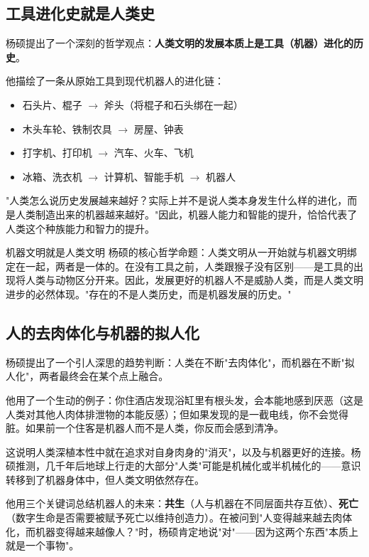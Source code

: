\documentclass[a4paper]{article}
\begin{document}
\subsection{工具进化史就是人类史}

杨硕提出了一个深刻的哲学观点：\textbf{人类文明的发展本质上是工具（机器）进化的历史}。

他描绘了一条从原始工具到现代机器人的进化链：
\begin{itemize}
    \item 石头片、棍子 $\to$ 斧头（将棍子和石头绑在一起）
    \item 木头车轮、铁制农具 $\to$ 房屋、钟表
    \item 打字机、打印机 $\to$ 汽车、火车、飞机
    \item 冰箱、洗衣机 $\to$ 计算机、智能手机 $\to$ 机器人
\end{itemize}

"人类怎么说历史发展越来越好？实际上并不是说人类本身发生什么样的进化，而是人类制造出来的机器越来越好。"因此，机器人能力和智能的提升，恰恰代表了人类这个种族能力和智力的提升。

\begin{importantbox}{机器文明就是人类文明}
杨硕的核心哲学命题：人类文明从一开始就与机器文明绑定在一起，两者是一体的。在没有工具之前，人类跟猴子没有区别——是工具的出现将人类与动物区分开来。因此，发展更好的机器人不是威胁人类，而是人类文明进步的必然体现。"存在的不是人类历史，而是机器发展的历史。"
\end{importantbox}

\subsection{人的去肉体化与机器的拟人化}

杨硕提出了一个引人深思的趋势判断：人类在不断"去肉体化"，而机器在不断"拟人化"，两者最终会在某个点上融合。

他用了一个生动的例子：你住酒店发现浴缸里有根头发，会本能地感到厌恶（这是人类对其他人肉体排泄物的本能反感）；但如果发现的是一截电线，你不会觉得脏。如果前一个住客是机器人而不是人类，你反而会感到清净。

这说明人类深植本性中就在追求对自身肉身的"消灭"，以及与机器更好的连接。杨硕推测，几千年后地球上行走的大部分"人类"可能是机械化或半机械化的——意识转移到了机器身体中，但人类文明依然存在。

他用三个关键词总结机器人的未来：\textbf{共生}（人与机器在不同层面共存互依）、\textbf{死亡}（数字生命是否需要被赋予死亡以维持创造力）。在被问到"人变得越来越去肉体化，而机器变得越来越像人？"时，杨硕肯定地说"对"——因为这两个东西"本质上就是一个事物"。
\end{document}
